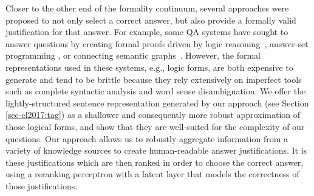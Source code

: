 \textcolor{common}{Closer to the other end of the formality continuum, several approaches were proposed to not only select a correct answer, but also provide a formally valid justification for that answer.  For example, some QA systems have sought to answer questions by creating formal proofs driven by logic reasoning~\cite{moldovan2003cogex,moldovan2007cogex,balduccini2008knowledge,maccartney2009natural,liang2013learning,lewis2013combining}, answer-set programming \cite{baral2006using,baral2011towards,baral2012answering,baral2012knowledge}, or connecting semantic graphs~\cite{banarescu2012amr,sharmatowards}. 
However, the formal representations used in these systems, e.g., logic forms, are both expensive to generate 
and tend to be brittle because they rely extensively on imperfect tools such as complete syntactic analysis and word sense disambiguation.
We offer the lightly-structured sentence representation generated by our approach (see Section \ref{sec-cl2017:tag}) as a shallower and consequently more robust approximation of those logical forms, and show that they are well-suited for the complexity of our questions.
Our approach allows us to robustly aggregate information from a variety of knowledge sources to create human-readable answer justifications.  
It is these justifications which are then ranked in order to choose the correct answer, using a reranking perceptron with a latent layer that models the correctness of those justifications.}


